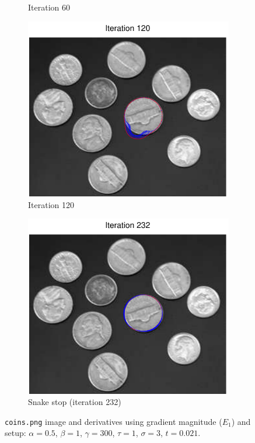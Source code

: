 \documentclass[11pt,a4paper]{article}
\begin{document}
\begin{figure}[H]
\begin{subfigure}[t]{0.21\textwidth}
        \caption{Iteration 60}
        \label{fig:coins_60}
    \end{subfigure}
    \begin{subfigure}[t]{0.21\textwidth}
        \includegraphics[width=\textwidth]{src/images/coins_gradient_120.pdf}
        \caption{Iteration 120}
        \label{fig:coins_120}
    \end{subfigure}
    \begin{subfigure}[t]{0.21\textwidth}
        \includegraphics[width=\textwidth]{src/images/coins_gradient_232.pdf}
        \caption{Snake stop (iteration 232)}
        \label{fig:coins_232}
    \end{subfigure}
    \caption{\texttt{coins.png} image and derivatives using gradient magnitude
($E_1$) and setup: $\alpha = 0.5$, $\beta = 1$, $\gamma = 300$, $\tau = 1$,
$\sigma = 3$, $t = 0.021$.}
    \label{fig:coins}
\end{figure}
\end{document}
